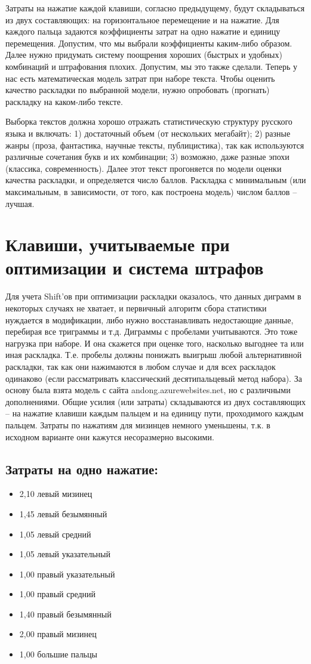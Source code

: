 \documentclass[14pt]{article} %
\begin{document}
Затраты на нажатие каждой клавиши, согласно предыдущему, будут складываться из двух составляющих: на горизонтальное перемещение и на нажатие. 
Для каждого пальца задаются коэффициенты затрат на одно нажатие и единицу перемещения. 
Допустим, что мы выбрали коэффициенты каким-либо образом. Далее нужно придумать систему поощрения хороших (быстрых и удобных) комбинаций и штрафования плохих.
Допустим, мы это также сделали. Теперь у нас есть математическая модель затрат при наборе текста.
Чтобы оценить качество раскладки по выбранной модели, нужно опробовать (прогнать) раскладку на каком-либо тексте.

Выборка текстов должна хорошо отражать статистическую структуру русского языка и включать:
1) достаточный объем (от нескольких мегабайт); 
2) разные жанры (проза, фантастика, научные тексты, публицистика), так как используются различные сочетания букв и их комбинации;
3) возможно, даже разные эпохи (классика, современность).
Далее этот текст прогоняется по модели оценки качества раскладки, и определяется число баллов. Раскладка с минимальным (или максимальным, в зависимости, от того, как построена модель) числом баллов – лучшая.

\section{Клавиши, учитываемые при оптимизации и система штрафов}


Для учета Shift'ов при оптимизации раскладки оказалось, что данных диграмм в некоторых случаях не хватает, и первичный алгоритм сбора статистики нуждается в модификации, либо нужно восстанавливать недостающие данные, перебирая все триграммы и т.д. Диграммы с пробелами учитываются. Это тоже нагрузка при наборе. И она скажется при оценке того, насколько выгоднее та или иная раскладка. Т.е. пробелы должны понижать выигрыш любой альтернативной раскладки, так как они нажимаются в любом случае и для всех раскладок одинаково (если рассматривать классический десятипальцевый метод набора).
За основу была взята модель с сайта andong.azurewebsites.net, но с различными дополнениями. Общие усилия (или затраты) складываются из двух составляющих – на нажатие клавиши каждым пальцем и на единицу пути, проходимого каждым пальцем. Затраты по нажатиям для мизинцев немного уменьшены, т.к. в исходном варианте они кажутся несоразмерно высокими.
\subsection{Затраты на одно нажатие:}
\begin{itemize}
\item
2,10 левый мизинец
\item
1,45 левый безымянный
\item
1,05 левый средний
\item
1,05 левый указательный
\item
1,00 правый указательный
\item
1,00 правый средний
\item
1,40 правый безымянный
\item
2,00 правый мизинец
\item
1,00 большие пальцы
\end{itemize}
\end{document}
